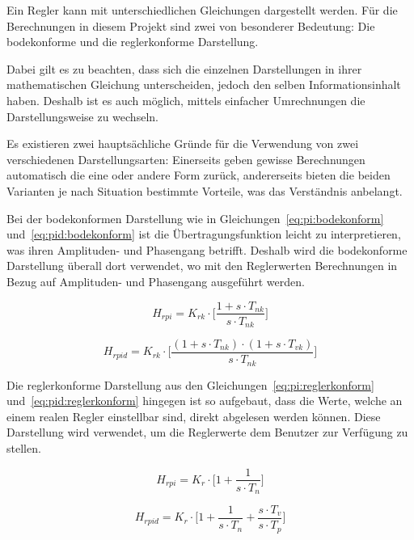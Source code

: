 Ein Regler  kann mit unterschiedlichen Gleichungen  dargestellt werden.  F\"ur
die Berechnungen  in diesem  Projekt sind  zwei von  besonderer Bedeutung: Die
bodekonforme und die reglerkonforme Darstellung.

Dabei gilt  es zu  beachten, dass  sich die  einzelnen Darstellungen  in ihrer
mathematischen Gleichung  unterscheiden, jedoch den  selben Informationsinhalt
haben. Deshalb   ist  es   auch  m\"oglich,  mittels  einfacher   Umrechnungen
die  Darstellungsweise   zu  wechseln.

Es  existieren  zwei  haupts\"achliche   Gr\"unde  f\"ur  die  Verwendung  von
zwei  verschiedenen Darstellungsarten: Einerseits  geben gewisse  Berechnungen
automatisch  die  eine oder  andere  Form  zur\"uck, andererseits  bieten  die
beiden Varianten je  nach Situation bestimmte Vorteile,  was das Verst\"andnis
anbelangt.

Bei der  bodekonformen Darstellung wie  in Gleichungen~\ref{eq:pi:bodekonform}
und~\ref{eq:pid:bodekonform}   ist   die  \"Ubertragungsfunktion   leicht   zu
interpretieren, was  ihren Amplituden- und Phasengang  betrifft.  Deshalb wird
die bodekonforme Darstellung \"uberall dort verwendet, wo mit den Reglerwerten
Berechnungen in Bezug auf Amplituden- und Phasengang ausgef\"uhrt werden.

\begin{equation} \label{eq:pi:bodekonform}
    H_{rpi} = K_{rk} \cdot \biggl[ \frac{1 + s \cdot T_{nk}}{s \cdot T_{nk}} \biggr]
\end{equation}

\begin{equation} \label{eq:pid:bodekonform}
    H_{rpid} = K_{rk} \cdot \biggl[ \frac{(1 + s \cdot T_{nk}) \cdot (1 + s \cdot T_{vk}) }{ s \cdot T_{nk} } \biggr]
\end{equation}


Die reglerkonforme  Darstellung aus  den Gleichungen~\ref{eq:pi:reglerkonform}
und~\ref{eq:pid:reglerkonform}  hingegen ist  so  aufgebaut,  dass die  Werte,
welche  an  einem realen  Regler  einstellbar  sind, direkt  abgelesen  werden
k\"onnen. Diese Darstellung  wird verwendet,  um die Reglerwerte  dem Benutzer
zur Verf\"ugung zu stellen.

\begin{equation} \label{eq:pi:reglerkonform}
    H_{rpi} = K_{r} \cdot \biggl[ 1 + \frac{1}{s \cdot T_{n}} \biggr]
\end{equation}

\begin{equation} \label{eq:pid:reglerkonform}
    H_{rpid} = K_{r} \cdot \biggl[ 1 + \frac{1}{s \cdot T_n} + \frac{s \cdot T_v}{s \cdot T_p} \biggr]
\end{equation}

